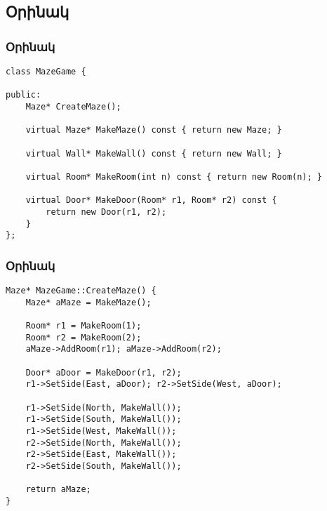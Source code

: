 \documentclass{beamer}
\begin{document}
\subsection{Օրինակ}
\begin{frame}[fragile]\frametitle{Օրինակ}
\begin{english}
\begin{verbatim}
class MazeGame {

public:
    Maze* CreateMaze();

    virtual Maze* MakeMaze() const { return new Maze; }

    virtual Wall* MakeWall() const { return new Wall; }

    virtual Room* MakeRoom(int n) const { return new Room(n); }

    virtual Door* MakeDoor(Room* r1, Room* r2) const {
        return new Door(r1, r2);
    }
};
\end{verbatim}
\end{english}
\end{frame}

\begin{frame}[fragile]\frametitle{Օրինակ}
\begin{english}
\begin{verbatim}
Maze* MazeGame::CreateMaze() {
    Maze* aMaze = MakeMaze();

    Room* r1 = MakeRoom(1);
    Room* r2 = MakeRoom(2);
    aMaze->AddRoom(r1); aMaze->AddRoom(r2);

    Door* aDoor = MakeDoor(r1, r2);
    r1->SetSide(East, aDoor); r2->SetSide(West, aDoor);

    r1->SetSide(North, MakeWall());
    r1->SetSide(South, MakeWall());
    r1->SetSide(West, MakeWall());
    r2->SetSide(North, MakeWall());
    r2->SetSide(East, MakeWall());
    r2->SetSide(South, MakeWall());

    return aMaze;
}
\end{verbatim}
\end{english}
\end{frame}
\end{document}
